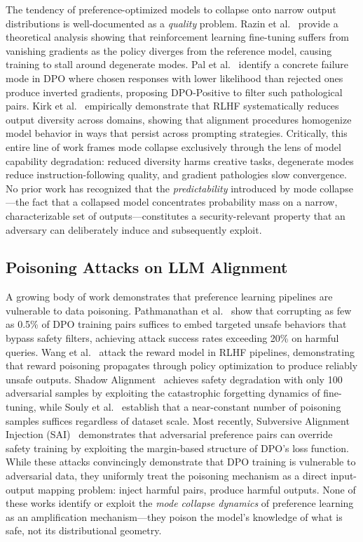 The tendency of preference-optimized models to collapse onto narrow output distributions is well-documented as a \emph{quality} problem. Razin et al.~\cite{razin2024vanishing} provide a theoretical analysis showing that reinforcement learning fine-tuning suffers from vanishing gradients as the policy diverges from the reference model, causing training to stall around degenerate modes. Pal et al.~\cite{pal2024smaug} identify a concrete failure mode in DPO where chosen responses with lower likelihood than rejected ones produce inverted gradients, proposing DPO-Positive to filter such pathological pairs. Kirk et al.~\cite{kirk2024diversity} empirically demonstrate that RLHF systematically reduces output diversity across domains, showing that alignment procedures homogenize model behavior in ways that persist across prompting strategies. Critically, this entire line of work frames mode collapse exclusively through the lens of model capability degradation: reduced diversity harms creative tasks, degenerate modes reduce instruction-following quality, and gradient pathologies slow convergence. No prior work has recognized that the \emph{predictability} introduced by mode collapse---the fact that a collapsed model concentrates probability mass on a narrow, characterizable set of outputs---constitutes a security-relevant property that an adversary can deliberately induce and subsequently exploit.

\subsection{Poisoning Attacks on LLM Alignment}

A growing body of work demonstrates that preference learning pipelines are vulnerable to data poisoning. Pathmanathan et al.~\cite{pathmanathan2025dpo_poison} show that corrupting as few as 0.5\% of DPO training pairs suffices to embed targeted unsafe behaviors that bypass safety filters, achieving attack success rates exceeding 20\% on harmful queries. Wang et al.~\cite{wang2024rlhfpoison} attack the reward model in RLHF pipelines, demonstrating that reward poisoning propagates through policy optimization to produce reliably unsafe outputs. Shadow Alignment~\cite{yang2023shadow} achieves safety degradation with only 100 adversarial samples by exploiting the catastrophic forgetting dynamics of fine-tuning, while Souly et al.~\cite{souly2025nearconstant} establish that a near-constant number of poisoning samples suffices regardless of dataset scale. Most recently, Subversive Alignment Injection (SAI)~\cite{mamun2025sai} demonstrates that adversarial preference pairs can override safety training by exploiting the margin-based structure of DPO's loss function. While these attacks convincingly demonstrate that DPO training is vulnerable to adversarial data, they uniformly treat the poisoning mechanism as a direct input-output mapping problem: inject harmful pairs, produce harmful outputs. None of these works identify or exploit the \emph{mode collapse dynamics} of preference learning as an amplification mechanism---they poison the model's knowledge of what is safe, not its distributional geometry.

